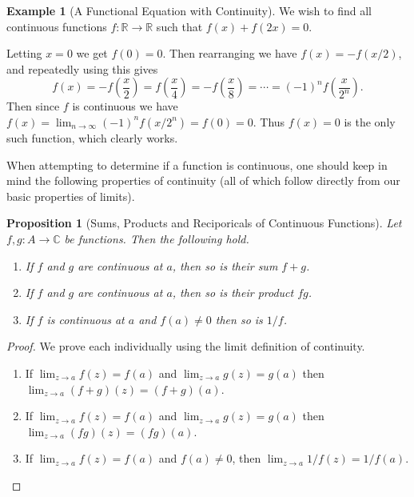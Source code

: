 \documentclass[11pt, a4paper]{article}
\newtheorem{proposition}[theorem]{Proposition}
\theoremstyle{definition}
\newtheorem{example}[theorem]{Example}
\newcommand{\C}{\mathbb{C}}
\newcommand{\R}{\mathbb{R}}
\begin{document}
\begin{example}[A Functional Equation with Continuity]
	We wish to find all continuous functions $f: \R \rightarrow \R$  such that $f(x) + f(2x) = 0$.

	Letting $x = 0$ we get $f(0) = 0$. Then rearranging we have
	$f(x) = -f(x/2)$, and repeatedly using this gives
	$$
	f(x) = -f\left(\frac{x}{2}\right) = f\left(\frac{x}{4}\right) = -f\left(\frac{x}{8}\right) = \cdots = (-1)^{n}f\left(\frac{x}{2^n}\right).
	$$
	Then since $f$ is continuous we have $f(x) = \lim_{n \to \infty} (-1)^n f(x/2^n) = f(0) = 0$. Thus $f(x) = 0$ is the only such function, which clearly works.
\end{example}


When attempting to determine if a function is continuous, one should keep in mind the following properties of continuity (all of which follow directly from our basic properties of limits).

\begin{proposition}[Sums, Products and Reciporicals of Continuous Functions]
	Let $f, g: A \rightarrow \C$ be functions. Then the following hold.
	\begin{enumerate}[label=(\roman*)]
		\item If $f$ and $g$ are continuous at $a$, then so is their sum $f + g$.
		\item If $f$ and $g$ are continuous at $a$, then so is their product $fg$.
		\item If $f$ is continuous at $a$ and $f(a) \neq 0$ then so is $1/f$.
	\end{enumerate}
\end{proposition}
\begin{proof}
	We prove each individually using the limit definition of continuity.
	\begin{enumerate}[label=(\roman*)]
		\item If $\displaystyle\lim_{z \to a} f(z) = f(a)$ and $\displaystyle\lim_{z \to a} g(z) = g(a)$ then $\displaystyle\lim_{z \to a} (f+g)(z) = (f+g)(a)$.
		\item If $\displaystyle\lim_{z \to a} f(z) = f(a)$ and $\displaystyle\lim_{z \to a} g(z) = g(a)$ then $\displaystyle\lim_{z \to a} (fg)(z) = (fg)(a)$.
		\item If $\displaystyle\lim_{z \to a} f(z) = f(a)$ and $f(a) \neq 0$, then $\displaystyle\lim_{z \to a} 1/f(z) = 1/f(a)$.
		 \qedhere
	\end{enumerate}
\end{proof}
\end{document}
